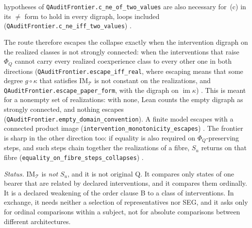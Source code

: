hypotheses of \texttt{QAuditFrontier.\allowbreak c\_ne\_of\_two\_values} are also necessary for~(c) in its $\ne$ form to hold in every digraph, loops included (\texttt{QAuditFrontier.\allowbreak c\_ne\_iff\_two\_values}) \stM.

The route therefore escapes the collapse exactly when the intervention digraph on the realized classes is not strongly connected: when the interventions that raise $\Phi_Q$ cannot carry every realized coexperience class to every other one in both directions (\texttt{QAuditFrontier.\allowbreak escape\_iff\_real}, where escaping means that some degree $g\circ\kappa$ that satisfies $\mathrm{IM}_{\mathcal T}$ is not constant on the realizations, and \texttt{QAuditFrontier.\allowbreak escape\_paper\_form}, with the digraph on $\operatorname{im}\kappa$) \stM. This is meant for a nonempty set of realizations: with none, Lean counts the empty digraph as strongly connected, and nothing escapes (\texttt{QAuditFrontier.\allowbreak empty\_domain\_convention}). A finite model escapes with a connected product image (\texttt{intervention\_monotonicity\_escapes}) \stL. The frontier is sharp in the other direction too: if equality is also required on $\Phi_Q$-preserving steps, and such steps chain together the realizations of a fibre, $S_u$ returns on that fibre (\texttt{equality\_on\_fibre\_steps\_collapses}) \stL.

\emph{Status.} $\mathrm{IM}_{\mathcal T}$ is \emph{not} $S_u$, and it is not original Q. It compares only states of one bearer that are related by declared interventions, and it compares them ordinally. It is a declared weakening of the order clause B to a class of interventions. In exchange, it needs neither a selection of representatives nor SEG, and it asks only for ordinal comparisons within a subject, not for absolute comparisons between different architectures.

